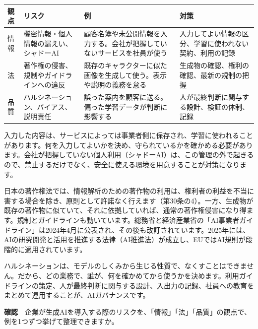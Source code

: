 \documentclass[paper=a4paper,fontsize=10pt,line_length=170mm,number_of_lines=46,baselineskip=1.6zw]{jlreq}
\newcommand\subhead[1]{\par\vspace{2.6mm}{\sffamily\bfseries\large #1}\par\vspace{1.3mm}}
\begin{document}
\subhead{3つの観点}
\begin{center}\small\renewcommand{\arraystretch}{1.15}\setlength{\tabcolsep}{1.5mm}
\begin{tabular}{|p{24.0mm}|p{44.3mm}|p{44.3mm}|p{44.3mm}|}\arrayrulecolor{rulec}\hline
\rowcolor{papertwo}\sffamily\bfseries 観点 & \sffamily\bfseries リスク & \sffamily\bfseries 例 & \sffamily\bfseries 対策\\\hline
情報 & 機密情報・個人情報の漏えい、シャドーAI & 顧客名簿や未公開情報を入力する。会社が把握していないサービスを社員が使う & 入力してよい情報の区分、学習に使われない契約、利用の記録\\\hline
法 & 著作権の侵害、規制やガイドラインへの違反 & 既存のキャラクターに似た画像を生成して使う。表示や説明の義務を怠る & 生成物の確認、権利の確認、最新の規制の把握\\\hline
品質 & ハルシネーション、バイアス、説明責任 & 誤った案内を顧客に送る。偏った学習データが判断に影響する & 人が最終判断に関与する設計、検証の体制、記録\\\hline
\end{tabular}\end{center}\vspace{0.5mm}
\subhead{情報の観点}
入力した内容は、サービスによっては事業者側に保存され、学習に使われることがあります。何を入力してよいかを決め、守られているかを確かめる必要があります。会社が把握していない個人利用（シャドーAI）は、この管理の外で起きるので、禁止するだけでなく、安全に使える環境を用意することが対策になります。\par\vspace{1.2mm}
\subhead{法の観点}
日本の著作権法では、情報解析のための著作物の利用は、権利者の利益を不当に害する場合を除き、原則として許諾なく行えます（第30条の4）。一方、生成物が既存の著作物に似ていて、それに依拠していれば、通常の著作権侵害になり得ます。規制とガイドラインも動いています。総務省と経済産業省の「AI事業者ガイドライン」は2024年4月に公表され、その後も改訂されています。2025年には、AIの研究開発と活用を推進する法律（AI推進法）が成立し、EUではAI規則が段階的に適用されています。\par\vspace{1.2mm}
\subhead{品質の観点とガバナンス}
ハルシネーションは、モデルのしくみから生じる性質で、なくすことはできません。だから、どの業務で、誰が、何を確かめてから使うかを決めます。利用ガイドラインの策定、人が最終判断に関与する設計、入出力の記録、社員への教育をまとめて運用することが、AIガバナンスです。\par\vspace{1.2mm}
\begin{checkbox}
{\sffamily\bfseries 確認}　企業が生成AIを導入する際のリスクを、「情報」「法」「品質」の観点で、例を1つずつ挙げて整理できますか。\par
\end{checkbox}
\end{document}
